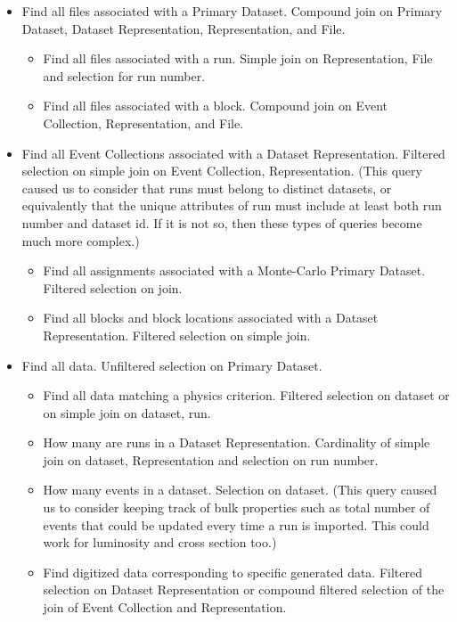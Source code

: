 \documentclass{cmspaper}
\begin{document}
\begin{itemize}
\item Find all files associated with a Primary Dataset.  Compound join on Primary
Dataset, Dataset Representation, Representation, and File.
  \begin{itemize}
  \item Find all files associated with a run.  Simple join on Representation, File and selection for run number.
  \item Find all files associated with a block.  Compound join on Event Collection, Representation, 
and File.
  \end{itemize}
\item Find all Event Collections associated with a Dataset Representation.  Filtered selection on 
simple join on Event Collection, Representation. (This query caused us to consider that runs 
must belong to distinct datasets, or equivalently that the unique attributes of 
run must include at least both run number and dataset id.  If it is not so, then 
these types of queries become much more complex.)
  \begin{itemize}
  \item Find all assignments associated with a Monte-Carlo Primary Dataset. Filtered selection on join.
  \item Find all blocks and block locations associated with a Dataset Representation. Filtered selection 
  on simple join.
  \end{itemize}
\item Find all data. Unfiltered selection on Primary Dataset.
  \begin{itemize}
  \item Find all data matching a physics criterion.  Filtered selection on dataset or 
  on simple join on dataset, run.
  \item How many are runs in a Dataset Representation.  
Cardinality of simple join on dataset, Representation and selection on run number.
  \item How many events in a dataset.  Selection on dataset.  (This query caused us to 
  consider keeping track of bulk properties such as total number of events that could be 
  updated every time a run is imported.  This could work for luminosity and cross section too.)
  \item Find digitized data corresponding to specific generated data. 
  Filtered selection on Dataset Representation or compound filtered selection of the join of 
Event Collection and Representation.  
  \end{itemize}
\end{itemize}
\end{document}
